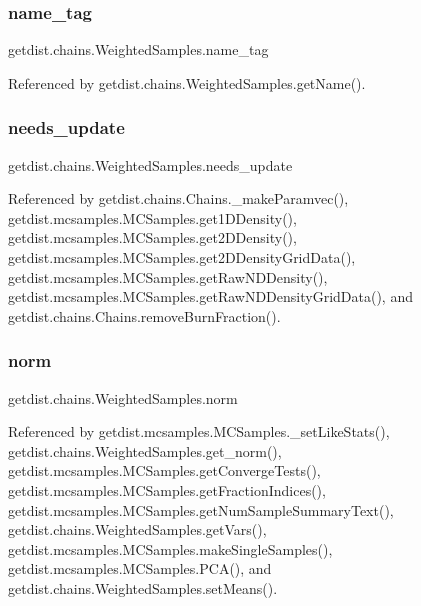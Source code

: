 \subsubsection{\texorpdfstring{name\+\_\+tag}{name\_tag}}
{\footnotesize\ttfamily getdist.\+chains.\+Weighted\+Samples.\+name\+\_\+tag}



Referenced by getdist.\+chains.\+Weighted\+Samples.\+get\+Name().

\mbox{\label{classgetdist_1_1chains_1_1WeightedSamples_a3383319042d4db9ec921b19542b1fb9c}} 
\subsubsection{\texorpdfstring{needs\+\_\+update}{needs\_update}}
{\footnotesize\ttfamily getdist.\+chains.\+Weighted\+Samples.\+needs\+\_\+update}



Referenced by getdist.\+chains.\+Chains.\+\_\+make\+Paramvec(), getdist.\+mcsamples.\+M\+C\+Samples.\+get1\+D\+Density(), getdist.\+mcsamples.\+M\+C\+Samples.\+get2\+D\+Density(), getdist.\+mcsamples.\+M\+C\+Samples.\+get2\+D\+Density\+Grid\+Data(), getdist.\+mcsamples.\+M\+C\+Samples.\+get\+Raw\+N\+D\+Density(), getdist.\+mcsamples.\+M\+C\+Samples.\+get\+Raw\+N\+D\+Density\+Grid\+Data(), and getdist.\+chains.\+Chains.\+remove\+Burn\+Fraction().

\mbox{\label{classgetdist_1_1chains_1_1WeightedSamples_a9668d5ddcf224bd3b53e83f0fae564e6}} 
\subsubsection{\texorpdfstring{norm}{norm}}
{\footnotesize\ttfamily getdist.\+chains.\+Weighted\+Samples.\+norm}



Referenced by getdist.\+mcsamples.\+M\+C\+Samples.\+\_\+set\+Like\+Stats(), getdist.\+chains.\+Weighted\+Samples.\+get\+\_\+norm(), getdist.\+mcsamples.\+M\+C\+Samples.\+get\+Converge\+Tests(), getdist.\+mcsamples.\+M\+C\+Samples.\+get\+Fraction\+Indices(), getdist.\+mcsamples.\+M\+C\+Samples.\+get\+Num\+Sample\+Summary\+Text(), getdist.\+chains.\+Weighted\+Samples.\+get\+Vars(), getdist.\+mcsamples.\+M\+C\+Samples.\+make\+Single\+Samples(), getdist.\+mcsamples.\+M\+C\+Samples.\+P\+C\+A(), and getdist.\+chains.\+Weighted\+Samples.\+set\+Means().

